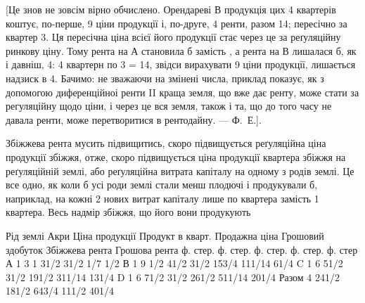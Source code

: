 [Це знов не зовсім вірно обчислено. Орендареві $В$ продукція цих 4 квартерів
коштує, по-перше, 9 ціни продукції і, по-друге,
4 ренти, разом 14; пересічно за квартер 3.
Ця пересічна ціна всієї його продукції стає через це за реґуляційну ринкову ціну. Тому рента на
$А$ становила б  замість , а рента на $В$ лишалася б, як і давніш, 4: 4 квартерн по 3 = 14, звідси вирахувати
9 ціни продукції, лишається надзиск в 4. Бачимо: не
зважаючи на змінені числа, приклад показує, як з допомогою диференційноі
ренти II краща земля, що вже дає ренту, може стати за регуляційну щодо ціни,
і через це вся земля, також і та, що до того часу не давала ренти, може перетворитися
в рентодайну. — Ф.~Е.].

Збіжжева рента мусить підвищитись, скоро підвищується реґуляційна
ціна продукції збіжжя, отже, скоро підвищується ціна продукції квартера збіжжя
на реґуляційній землі, або реґуляційна витрата капіталу на одному з родів
землі. Це все одно, як коли б усі роди землі стали менш плодючі і продукували
б, наприклад, на кожні 2 нових витрат капіталу лише по 
квартера замість 1 квартера. Весь надмір збіжжя, що його вони продукують

Рід землі    Акри    Ціна продукції    Продукт в кварт. Продажна  ціна    Грошовий  здобуток
Збіжжева рента    Грошова  рента
        ф. стер. ф. стер. ф. стер. ф. стер. ф. стер
А                    1    3             1            31/2       31/2        1/7            1/2
В                    1    9 1/2       41/2    31/2       153/4        111/14    61/4
C                    1    6             51/2    31/2        191/2        311/14    131/4
D                    1    6             71/2    31/2        261/2        511/14     201/4
Разом           4    241/2    181/2           643/4    111/2            401/4
\parbreak{}  %
